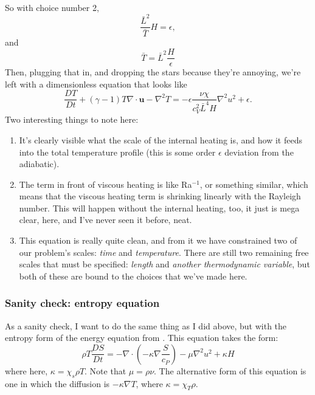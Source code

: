 \documentclass[aps, pre, onecolumn, nofootinbib, notitlepage, groupedaddress, amsfonts, amssymb, amsmath, longbibliography]{revtex4-1}
\newcommand{\grad}{\ensuremath{\nabla}}
\begin{document}
So with choice number 2,
$$
\frac{\bar{L}^2}{\bar{T}} H  = \epsilon,
$$
and
$$
\bar{T} = \bar{L}^2 \frac{H}{\epsilon}
$$
Then, plugging that in, and dropping the stars because they're annoying, we're left with
a dimensionless equation that looks like
\begin{equation}
\boxed{
\frac{D T}{D t} + (\gamma - 1) T \grad\cdot\bm{u} - \grad^2 T 
= -\epsilon \frac{\nu\chi}{c_V^2 \bar{L}^4 H} \grad^2 u^2 + \epsilon}.
\end{equation}
Two interesting things to note here:
\begin{enumerate}
\item It's clearly visible what the scale of the internal heating is, and how it feeds into
the total temperature profile (this is some order $\epsilon$ deviation from the adiabatic).
\item The term in front of viscous heating is like Ra$^{-1}$, or something similar, which
means that the viscous heating term is shrinking linearly with the Rayleigh number.  This
will happen without the internal heating, too, it just is mega clear, here, and I've never
seen it before, neat.
\item This equation is really quite clean, and from it we have constrained two of our problem's
scales: \emph{time} and \emph{temperature}.  There are still two remaining free scales that
must be specified: \emph{length} and \emph{another thermodynamic variable}, but both of
these are bound to the choices that we've made here.
\end{enumerate}

\subsubsection{Sanity check: entropy equation}
As a sanity check, I want to do the same thing as I did above, but with the entropy
form of the energy equation from \cite{lecoanet&all2014}.  This equation takes the form:
\begin{equation}
\rho T \frac{D S}{D t} = -\grad \cdot (-\kappa \grad \frac{S}{c_P}) - \mu \grad^2 u^2 + \kappa H 
\end{equation}
where here, $\kappa = \chi_s \rho T$.  Note that $\mu = \rho \nu$.  The alternative form of this equation is one in which
the diffusion is $-\kappa \grad T$, where $\kappa = \chi_T \rho$.
\end{document}
